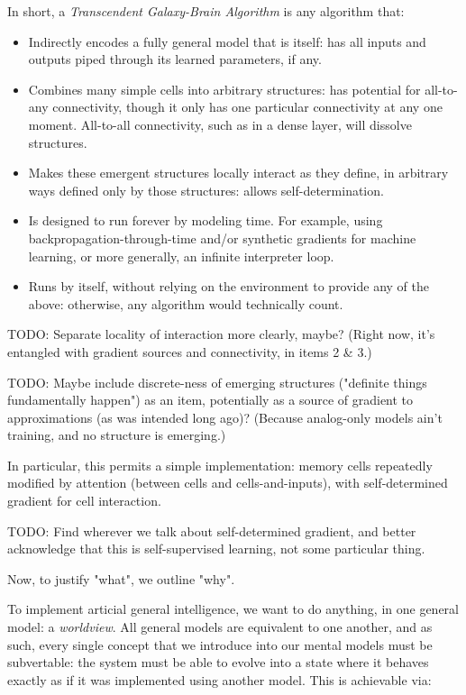 \documentclass{article}
\begin{document}
In short, a \textit{Transcendent Galaxy-Brain Algorithm} is any algorithm that:

\begin{itemize}
\item Indirectly encodes a fully general model that is itself: has all inputs and outputs piped through its learned parameters, if any.
\item Combines many simple cells into arbitrary structures: has potential for all-to-any connectivity, though it only has one particular connectivity at any one moment. All-to-all connectivity, such as in a dense layer, will dissolve structures.
\item Makes these emergent structures locally interact as they define, in arbitrary ways defined only by those structures: allows self-determination.
\item Is designed to run forever by modeling time. For example, using backpropagation-through-time and/or synthetic gradients for machine learning, or more generally, an infinite interpreter loop.
\item Runs by itself, without relying on the environment to provide any of the above: otherwise, any algorithm would technically count.
\end{itemize}

    TODO: Separate locality of interaction more clearly, maybe? (Right now, it's entangled with gradient sources and connectivity, in items 2 & 3.)

    TODO: Maybe include discrete-ness of emerging structures ("definite things fundamentally happen") as an item, potentially as a source of gradient to approximations (as was intended long ago)? (Because analog-only models ain't training, and no structure is emerging.)

In particular, this permits a simple implementation: memory cells repeatedly modified by attention (between cells and cells-and-inputs), with self-determined gradient for cell interaction.

    TODO: Find wherever we talk about self-determined gradient, and better acknowledge that this is self-supervised learning, not some particular thing.

Now, to justify "what", we outline "why".

To implement articial general intelligence, we want to do anything, in one general model: a \textit{worldview}. All general models are equivalent to one another, and as such, every single concept that we introduce into our mental models must be subvertable: the system must be able to evolve into a state where it behaves exactly as if it was implemented using another model. This is achievable via:
\end{document}
